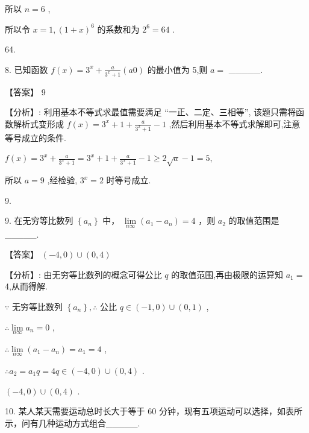\documentclass[10pt]{article}
\begin{document}
所以 \(n = 6\) ,

所以令 \(x = 1,{\left( 1 + x\right) }^{6}\) 的系数和为 \({2}^{6} = {64}\) .

64.

8. 已知函数 \(f\left( x\right)  = {3}^{x} + \frac{a}{{3}^{x} + 1}\left( {a0}\right)\) 的最小值为 5,则 \(a =\) \_\_\_\_\_.

【答案】 9

【分析】: 利用基本不等式求最值需要满足 “一正、二定、三相等”, 该题只需将函数解析式变形成 \(f\left( x\right)  = {3}^{x} + 1 + \frac{a}{{3}^{x} + 1} - 1\) ,然后利用基本不等式求解即可,注意等号成立的条件.

\(f\left( x\right)  = {3}^{x} + \frac{a}{{3}^{x} + 1} = {3}^{x} + 1 + \frac{a}{{3}^{x} + 1} - 1 \geq  2\sqrt{a} - 1 = 5,\)

所以 \(a = 9\) ,经检验, \({3}^{x} = 2\) 时等号成立.

9.

9. 在无穷等比数列 \(\left\{  {a}_{n}\right\}\) 中， \(\mathop{\lim }\limits_{{n\infty }}\left( {{a}_{1} - {a}_{n}}\right)  = 4\) ，则 \({a}_{2}\) 的取值范围是\_\_\_\_\_.

【答案】 \(\left( {-4,0}\right)  \cup  \left( {0,4}\right)\)

【分析】: 由无穷等比数列的概念可得公比 \(q\) 的取值范围,再由极限的运算知 \({a}_{1} =\) 4,从而得解.

\(\because\) 无穷等比数列 \(\left\{  {a}_{n}\right\}  ,\therefore\) 公比 \(q \in  \left( {-1,0}\right)  \cup  \left( {0,1}\right)\) ,

\(\therefore \mathop{\lim }\limits_{{n\infty }}{a}_{n} = 0\) ,

\(\therefore \mathop{\lim }\limits_{{n\infty }}\left( {{a}_{1} - {a}_{n}}\right)  = {a}_{1} = 4\) ,

\(\therefore {a}_{2} = {a}_{1}q = {4q} \in  \left( {-4,0}\right)  \cup  \left( {0,4}\right)\) .

\(\left( {-4,0}\right)  \cup  \left( {0,4}\right)\) .

10. 某人某天需要运动总时长大于等于 60 分钟，现有五项运动可以选择，如表所示，问有几种运动方式组合\_\_\_\_\_.

\begin{center}
\end{center}
\end{document}
